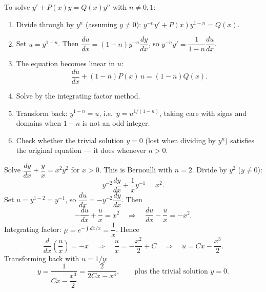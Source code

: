 \documentclass[11pt]{article}
\newcommand{\cle}[1]{{\popxbold\color{popdark}#1}}
\begin{document}
\begin{methode}[Bernoulli substitution $u = y^{1-n}$]
To solve $y' + P(x)y = Q(x)y^n$ with $n \neq 0, 1$:
\begin{enumerate}
\item Divide through by $y^n$ (assuming $y \neq 0$): $y^{-n}y' + P(x)y^{1-n} = Q(x)$.
\item Set $u = y^{1-n}$. Then $\dfrac{du}{dx} = (1-n)y^{-n}\dfrac{dy}{dx}$, so $y^{-n}y' = \dfrac{1}{1-n}\dfrac{du}{dx}$.
\item The equation becomes \cle{linear} in $u$:
\[ \frac{du}{dx} + (1-n)P(x)\,u = (1-n)Q(x). \]
\item Solve by the integrating factor method.
\item Transform back: $y^{1-n} = u$, i.e.\ $y = u^{1/(1-n)}$, taking care with signs and domains when $1-n$ is not an odd integer.
\item Check whether the \cle{trivial solution} $y = 0$ (lost when dividing by $y^n$) satisfies the original equation — it does whenever $n > 0$.
\end{enumerate}
\end{methode}

\begin{exoresolu}
Solve $\dfrac{dy}{dx} + \dfrac{y}{x} = x^2 y^2$ for $x > 0$.
\tcblower
This is Bernoulli with $n = 2$. Divide by $y^2$ ($y \neq 0$):
\[ y^{-2}\frac{dy}{dx} + \frac{1}{x}y^{-1} = x^2. \]
Set $u = y^{1-2} = y^{-1}$, so $\dfrac{du}{dx} = -y^{-2}\dfrac{dy}{dx}$. Then
\[ -\frac{du}{dx} + \frac{u}{x} = x^2 \quad\Longrightarrow\quad \frac{du}{dx} - \frac{u}{x} = -x^2. \]
Integrating factor: $\mu = e^{-\int dx/x} = \dfrac{1}{x}$. Hence
\[ \frac{d}{dx}\!\left(\frac{u}{x}\right) = -x \quad\Longrightarrow\quad \frac{u}{x} = -\frac{x^2}{2} + C \quad\Longrightarrow\quad u = Cx - \frac{x^3}{2}. \]
Transforming back with $u = 1/y$:
\[ \boxed{y = \frac{1}{Cx - \dfrac{x^3}{2}} = \frac{2}{2Cx - x^3}}, \qquad \text{plus the trivial solution } y = 0. \]
\end{exoresolu}
\end{document}
